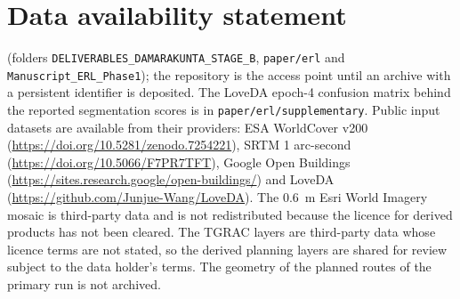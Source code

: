 \section*{Data availability statement}
 (folders \texttt{DELIVERABLES\_DAMARAKUNTA\_STAGE\_B}, \texttt{paper/erl} and \texttt{Manuscript\_ERL\_Phase1}); the repository is the access point until an archive with a persistent identifier is deposited. The LoveDA epoch-4 confusion matrix behind the reported segmentation scores is in \texttt{paper/erl/supplementary}. Public input datasets are available from their providers: ESA WorldCover v200 (\url{https://doi.org/10.5281/zenodo.7254221}), SRTM 1 arc-second (\url{https://doi.org/10.5066/F7PR7TFT}), Google Open Buildings (\url{https://sites.research.google/open-buildings/}) and LoveDA (\url{https://github.com/Junjue-Wang/LoveDA}). The 0.6~m Esri World Imagery mosaic is third-party data and is not redistributed because the licence for derived products has not been cleared. The TGRAC layers are third-party data whose licence terms are not stated, so the derived planning layers are shared for review subject to the data holder's terms. The geometry of the planned routes of the primary run is not archived.
